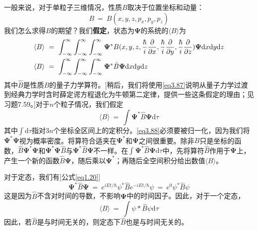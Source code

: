 \documentclass[12pt,a4paper,openany]{ctexbook}
\newcommand{\ang}[1]{\langle #1 \rangle}
\newcommand{\dd}[1]{\mathrm{d} #1}
\begin{document}
\begin{flushleft}
一般来说，对于单粒子三维情况，性质$B$取决于位置坐标和动量：
\begin{equation*}
    B\ =\ B(x,y,z,p_x,p_y,p_z)
\end{equation*}
我们怎么求得$B$的期望？我们\textbf{假定}，状态为$\bm{\Psi}$的系统的$\langle B\rangle$为
\begin{align}
    \langle B\rangle\ &=\ \int_{-\infty}^{\infty}\int_{-\infty}^{\infty}\int_{-\infty}^{\infty}\bm{\Psi}^*B(x,y,z,\frac{\hbar}{i}\frac{\partial}{\partial x},\frac{\hbar}{i}\frac{\partial}{\partial y},\frac{\hbar}{i}\frac{\partial}{\partial z})\bm{\Psi}\mathrm{d}x\mathrm{d}y\mathrm{d}z \notag \\
    \langle B\rangle\ &=\ \int_{-\infty}^{\infty}\int_{-\infty}^{\infty}\int_{-\infty}^{\infty}\bm{\Psi}^*\hat{B}\bm{\Psi}\mathrm{d}x\mathrm{d}y\mathrm{d}z \label{eq3.87}
\end{align}
其中$\hat{B}$是性质$B$的量子力学算符。[稍后，我们将使用\eqref{eq3.87}说明从量子力学过渡到经典力学时含时薛定谔方程退化为牛顿第二定律，提供一些这条假定的理由；见习题7.59。]对于$n$个粒子情况，我们假定
\begin{equation}
    \boxed{\langle B\rangle\ =\ \int \bm{\Psi}^*\hat{B}\bm{\Psi}\mathrm{d}\tau} \label{eq3.88}
\end{equation}
其中$\int \mathrm{d}\tau$指对$3n$个坐标全区间上的定积分。\eqref{eq3.88}必须要被归一化，因为我们将$\bm{\Psi}^*\bm{\Psi}$视为概率密度。将算符合适夹在$\bm{\Psi}^*$和$\bm{\Psi}$之间很重要。除非$B$只是坐标的函数，$\hat{B}\bm{\Psi}^*\bm{\Psi}$和$\bm{\Psi}^*\bm{\Psi}\hat{B}$与$\bm{\Psi}^*\hat{B}\bm{\Psi}$不一样。在$\int\bm{\Psi}^*\hat{B}\bm{\Psi}\mathrm{d}\tau$中，先将算符$\hat{B}$作用于$\bm{\Psi}$上，产生一个新的函数$\hat{B}\bm{\Psi}$，随后乘以$\bm{\Psi}^*$；再随后全空间积分给出数值$\langle B\rangle$。

对于定态，我们有[公式\eqref{eq1.20}]
\begin{equation*}
    \bm{\Psi}^*\hat{B}\bm{\Psi}\ =\ e^{iEt/\hbar}\psi^*\hat{B}e^{-iEt/\hbar}\psi\ =\ e^0\psi^*\hat{B}\psi
\end{equation*}
这是因为$\hat{B}$不含对时间的导数，不影响$\bm{\Psi}$中的时间因子。因此，对于一个定态，
\begin{equation}
    \ang{B}\ =\ \int \psi*\hat{B}\psi \dd{\tau} \label{eq3.89}
\end{equation}
因此，若$\hat{B}$是与时间无关的，则定态下$\hat{B}$也是与时间无关的。


\end{flushleft}
\end{document}
